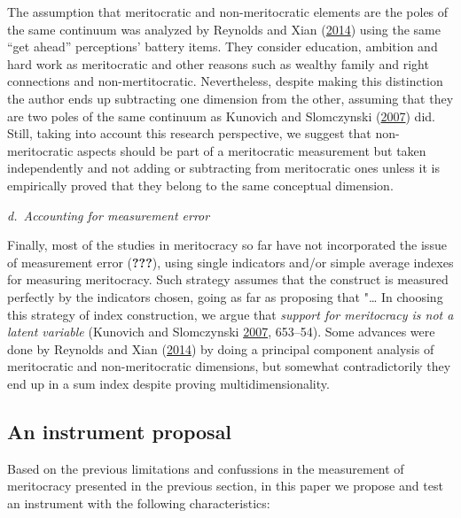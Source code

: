 \documentclass[
]{article}
\begin{document}
The assumption that meritocratic and non-meritocratic elements are the poles of the same continuum was analyzed by Reynolds and Xian (\protect\hyperlink{ref-reynolds_perceptions_2014}{2014}) using the same ``get ahead'' perceptions' battery items. They consider education, ambition and hard work as meritocratic and other reasons such as wealthy family and right connections and non-mertitocratic. Nevertheless, despite making this distinction the author ends up subtracting one dimension from the other, assuming that they are two poles of the same continuum as Kunovich and Slomczynski (\protect\hyperlink{ref-kunovich_systems_2007}{2007}) did. Still, taking into account this research perspective, we suggest that non-meritocratic aspects should be part of a meritocratic measurement but taken independently and not adding or subtracting from meritocratic ones unless it is empirically proved that they belong to the same conceptual dimension.

\emph{d.~Accounting for measurement error}

Finally, most of the studies in meritocracy so far have not incorporated the issue of measurement error ({\textbf{???}}), using single indicators and/or simple average indexes for measuring meritocracy. Such strategy assumes that the construct is measured perfectly by the indicators chosen, going as far as proposing that "\ldots{} In choosing this strategy of index construction, we argue that \emph{support for meritocracy is not a latent variable} (Kunovich and Slomczynski \protect\hyperlink{ref-kunovich_systems_2007}{2007}, 653--54). Some advances were done by Reynolds and Xian (\protect\hyperlink{ref-reynolds_perceptions_2014}{2014}) by doing a principal component analysis of meritocratic and non-meritocratic dimensions, but somewhat contradictorily they end up in a sum index despite proving multidimensionality.

\hypertarget{instrumentprop}{%
\subsection*{An instrument proposal}\label{instrumentprop}}

Based on the previous limitations and confussions in the measurement of meritocracy presented in the previous section, in this paper we propose and test an instrument with the following characteristics:
\end{document}

